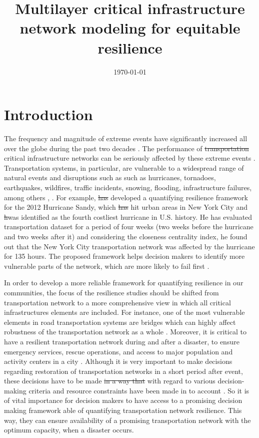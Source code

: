 \documentclass[11pt,twoside]{article}
\numberwithin{equation}{section}
\newcommand{\?}{\stackrel{?}{=}}
\begin{document}
\title{Multilayer critical infrastructure network modeling for equitable resilience}

\author{}
\date{\today}
\maketitle



\section{Introduction}
The frequency and magnitude of extreme events have signiﬁcantly increased all over the globe during the past two decades
\citep{kermanshah2017robustness}. The performance of \st{transportation} critical infrastructure networks can be
seriously affected by these extreme events \citep{ilbeigi2019statistical}.  Transportation systems, in particular, are
vulnerable to a widespread range of natural events and disruptions such as such as hurricanes, tornadoes, earthquakes,
wildfires, traffic incidents, snowing, flooding, infrastructure failures, among others
\citep{bhavathrathan2018algorithm}, \citep{twumasi-boakye2018resilience}.  For example, \citet{ilbeigi2019statistical}
\st{has} developed a quantifying resilience framework for the 2012 Hurricane Sandy, which \st{has} hit urban areas in
New York City and \st{h}was identified as the fourth costliest hurricane in U.S. history.  He has evaluated
transportation dataset for a period of four weeks (two weeks before the hurricane and two weeks after it) and
considering the closeness centrality index, he found out that the New York City transportation network was affected by
the hurricane for 135 hours. The proposed framework helps decision makers to identify more vulnerable parts of the
network, which are more likely to fail first \citep{ilbeigi2019statistical}.
  
In order to develop a more reliable framework for quantifying resilience in our communities, the focus of the
resilience studies should be shifted from transportation network to a more comprehensive view in which all critical
infrastructures elements are included. For instance, one of the most vulnerable elements in road transportation systems
are bridges which can highly affect robustness of the transportation network as a whole
\citep{zhang2017resiliencebased}.  Moreover, 
it is critical to have a resilient transportation network during and after a disaster, to ensure emergency services,
rescue operations, and access to major population and activity centers in a city \citep{ilbeigi2019statistical}.
Although it is very important to make decisions regarding restoration of transportation networks in a short period after
event, these decisions have to be made \st{in a way that} with regard to various decision-making criteria and resource
constraints have been made in to account \citep{liu2020optimal}.  So it is of vital importance for decision makers to
have access to a promising decision making framework able of quantifying transportation network resilience. This way,
they can ensure availability of a promising transportation network with the optimum capacity, when a disaster occurs.
\end{document}

